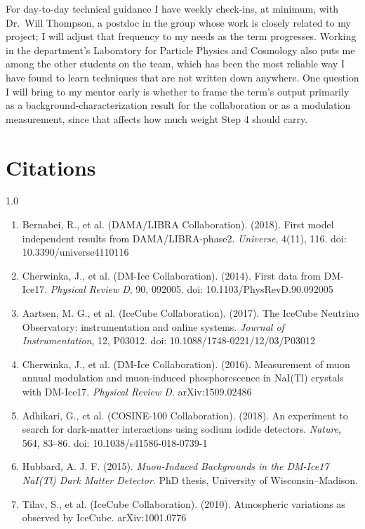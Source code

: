 \documentclass[12pt,letterpaper]{article}
\begin{document}
For day-to-day technical guidance I have weekly check-ins, at minimum, with Dr.\ Will
Thompson, a postdoc in the group whose work is closely related to my project; I will
adjust that frequency to my needs as the term progresses. Working in the department's
Laboratory for Particle
Physics and Cosmology also puts me among the other students on the team, which has been
the most reliable way I have found to learn techniques that are not written down
anywhere. One question I will bring to my mentor early is whether to frame the term's
output primarily as a background-characterization result for the collaboration or as a
modulation measurement, since that affects how much weight Step 4 should carry.

\section{Citations}
\begin{spacing}{1.0}
\begin{enumerate}[leftmargin=*,itemsep=3pt]
\item Bernabei, R., et al. (DAMA/LIBRA Collaboration). (2018). First model independent
results from DAMA/LIBRA-phase2. \emph{Universe}, 4(11), 116.
doi: 10.3390/universe4110116

\item Cherwinka, J., et al. (DM-Ice Collaboration). (2014). First data from DM-Ice17.
\emph{Physical Review D}, 90, 092005. doi: 10.1103/PhysRevD.90.092005

\item Aartsen, M. G., et al. (IceCube Collaboration). (2017). The IceCube Neutrino
Observatory: instrumentation and online systems. \emph{Journal of Instrumentation},
12, P03012. doi: 10.1088/1748-0221/12/03/P03012

\item Cherwinka, J., et al. (DM-Ice Collaboration). (2016). Measurement of muon annual
modulation and muon-induced phosphorescence in NaI(Tl) crystals with DM-Ice17.
\emph{Physical Review D}. arXiv:1509.02486

\item Adhikari, G., et al. (COSINE-100 Collaboration). (2018). An experiment to search
for dark-matter interactions using sodium iodide detectors. \emph{Nature}, 564, 83--86.
doi: 10.1038/s41586-018-0739-1

\item Hubbard, A. J. F. (2015). \emph{Muon-Induced Backgrounds in the DM-Ice17 NaI(Tl)
Dark Matter Detector}. PhD thesis, University of Wisconsin--Madison.

\item Tilav, S., et al. (IceCube Collaboration). (2010). Atmospheric variations as
observed by IceCube. arXiv:1001.0776
\end{enumerate}
\end{spacing}
\end{document}
